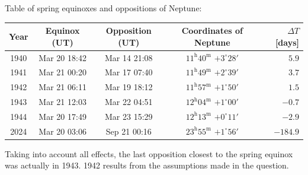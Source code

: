 \medskip
Table of spring equinoxes and oppositions of Neptune:

\begin{center}
\begin{tabular}{|c|c|c|c|r|}
\hline
Year & Equinox (UT) & Opposition (UT) & Coordinates of Neptune
  & $\Delta T$ [days]\\
\hline
1940 & Mar 20 18:42 & Mar 14 21:08
  & $11^{\mathrm{h}}40^{\mathrm{m}}$ $+3^\circ 28'$ & $5.9$\\
1941 & Mar 21 00:20 & Mar 17 07:40
  & $11^{\mathrm{h}}49^{\mathrm{m}}$ $+2^\circ 39'$ & $3.7$\\
1942 & Mar 21 06:11 & Mar 19 18:12
  & $11^{\mathrm{h}}57^{\mathrm{m}}$ $+1^\circ 50'$ & $1.5$\\
1943 & Mar 21 12:03 & Mar 22 04:51
  & $12^{\mathrm{h}}04^{\mathrm{m}}$ $+1^\circ 00'$ & $-0.7$\\
1944 & Mar 20 17:49 & Mar 23 15:29
  & $12^{\mathrm{h}}13^{\mathrm{m}}$ $+0^\circ 11'$ & $-2.9$\\
\hline
2024 & Mar 20 03:06 & Sep 21 00:16
  & $23^{\mathrm{h}}55^{\mathrm{m}}$ $+1^\circ 56'$ & $-184.9$\\
\hline
\end{tabular}
\end{center}

Taking into account all effects, the last opposition closest to the spring
equinox was actually in 1943. 1942 results from the assumptions made in the
question.
